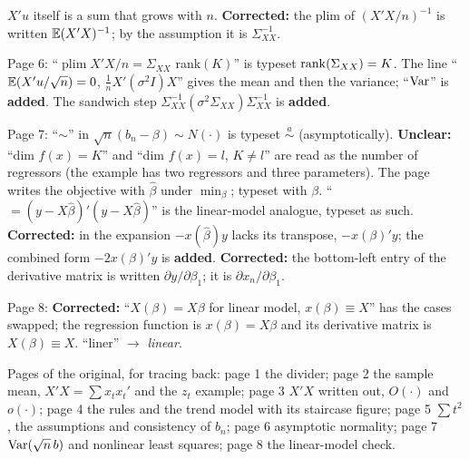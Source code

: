 \documentclass[11pt]{article}
\begin{document}
\begin{transcriptnotes}
        $X'u$ itself is a sum that grows with $n$. \textbf{Corrected:} the plim of
        $(X'X/n)^{-1}$ is written $\mathbb{E}(X'X)^{-1}$; by the assumption it is
        $\Sigma_{XX}^{-1}$.
  \item Page 6: ``$\operatorname*{plim}X'X/n = \Sigma_{XX}$ rank$(K)$'' is typeset
        $\operatorname{rank}(\Sigma_{XX}) = K$. The line ``$\mathbb{E}(X'u/\sqrt{n}) = 0$, $\tfrac1n
        X'(\sigma^{2}I)X$'' gives the mean and then the variance; ``$\operatorname{Var}$'' is
        \textbf{added}. The sandwich step
        $\Sigma_{XX}^{-1}(\sigma^{2}\Sigma_{XX})\Sigma_{XX}^{-1}$ is \textbf{added}.
  \item Page 7: ``$\sim$'' in $\sqrt{n}(b_{n} - \beta) \sim N(\cdot)$ is typeset
        $\overset{a}{\sim}$ (asymptotically). \textbf{Unclear:} ``dim $f(x) = K$'' and
        ``dim $f(x) = l$, $K \neq l$'' are read as the number of regressors (the
        example has two regressors and three parameters). The page writes the
        objective with $\hat\beta$ under $\min_{\beta}$; typeset with $\beta$.
        ``$=(y - X\hat\beta)'(y - X\hat\beta)$'' is the linear-model analogue,
        typeset as such. \textbf{Corrected:} in the expansion
        $-x(\hat\beta)y$ lacks its transpose, $-x(\beta)'y$; the combined form
        $-2x(\beta)'y$ is \textbf{added}. \textbf{Corrected:} the bottom-left entry
        of the derivative matrix is written $\partial y/\partial\beta_{1}$; it is
        $\partial x_{n}/\partial\beta_{1}$.
  \item Page 8: \textbf{Corrected:} ``$X(\beta) = X\beta$ for linear model,
        $x(\beta) \equiv X$'' has the cases swapped; the regression function is
        $x(\beta) = X\beta$ and its derivative matrix is $X(\beta) \equiv X$.
        ``liner'' $\to$ \emph{linear}.
  \item Pages of the original, for tracing back: page 1 the divider; page 2 the
        sample mean, $X'X = \sum x_{t}x_{t}'$ and the $z_{t}$ example; page 3 $X'X$
        written out, $O(\cdot)$ and $o(\cdot)$; page 4 the rules and the trend
        model with its staircase figure; page 5 $\sum t^{2}$, the assumptions and
        consistency of $b_{n}$; page 6 asymptotic normality; page 7
        $\operatorname{Var}(\sqrt{n}\,b)$ and nonlinear least squares; page 8 the linear-model
        check.
\end{transcriptnotes}
\end{document}
